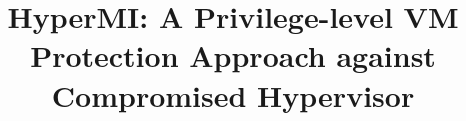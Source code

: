 \documentclass[conference]{IEEEtran}
\begin{document}
\title{HyperMI: A Privilege-level VM Protection Approach against Compromised Hypervisor}

\maketitle



\begin{abstract}

%




\end{abstract}
\end{document}
